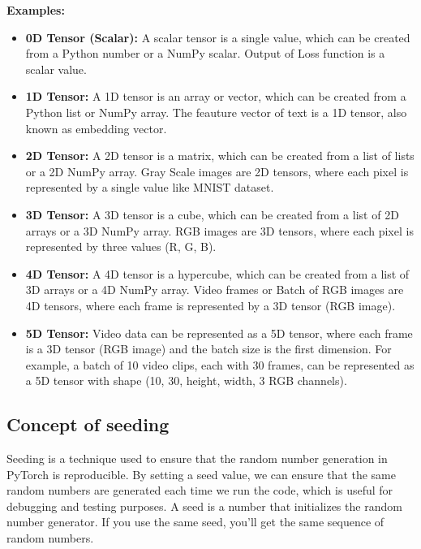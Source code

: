 \documentclass[12pt, a4paper]{article}
\begin{document}
\textbf{Examples:}
\begin{itemize}[itemsep=0.1em]
    \item \textbf{0D Tensor (Scalar):} A scalar tensor is a single value, which can be created from a Python number or a NumPy scalar. Output of Loss function is a scalar value.
    \item \textbf{1D Tensor:} A 1D tensor is an array or vector, which can be created from a Python list or NumPy array. The feauture vector of text is a 1D tensor, also known as embedding vector.
    \item \textbf{2D Tensor:} A 2D tensor is a matrix, which can be created from a list of lists or a 2D NumPy array. Gray Scale images are 2D tensors, where each pixel is represented by a single value like MNIST dataset.
    \item \textbf{3D Tensor:} A 3D tensor is a cube, which can be created from a list of 2D arrays or a 3D NumPy array. RGB images are 3D tensors, where each pixel is represented by three values (R, G, B).
    \item \textbf{4D Tensor:} A 4D tensor is a hypercube, which can be created from a list of 3D arrays or a 4D NumPy array. Video frames or Batch of RGB images are 4D tensors, where each frame is represented by a 3D tensor (RGB image).
    \item \textbf{5D Tensor:} Video data can be represented as a 5D tensor, where each frame is a 3D tensor (RGB image) and the batch size is the first dimension. For example, a batch of 10 video clips, each with 30 frames, can be represented as a 5D tensor with shape (10, 30, height, width, 3 RGB channels).
\end{itemize}

\subsection{Concept of seeding}

Seeding is a technique used to ensure that the random number generation in PyTorch is reproducible. By setting a seed value, we can ensure that the same random numbers are generated each time we run the code, which is useful for debugging and testing purposes.
A seed is a number that initializes the random number generator. If you use the same seed, you'll get the same sequence of random numbers.
\end{document}
